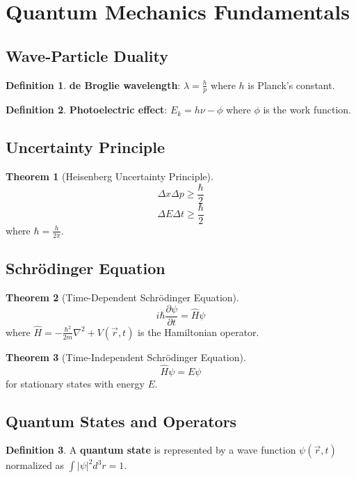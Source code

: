 \documentclass[11pt]{article}
\theoremstyle{definition}
\newtheorem{definition}{Definition}[section]
\newtheorem{theorem}{Theorem}[section]
\begin{document}
\section{Quantum Mechanics Fundamentals}

\subsection{Wave-Particle Duality}
\begin{definition}
\textbf{de Broglie wavelength}: $\lambda = \frac{h}{p}$ where $h$ is Planck's constant.
\end{definition}

\begin{definition}
\textbf{Photoelectric effect}: $E_k = h\nu - \phi$ where $\phi$ is the work function.
\end{definition}

\subsection{Uncertainty Principle}
\begin{theorem}[Heisenberg Uncertainty Principle]
$$\Delta x \Delta p \geq \frac{\hbar}{2}$$
$$\Delta E \Delta t \geq \frac{\hbar}{2}$$
where $\hbar = \frac{h}{2\pi}$.
\end{theorem}

\subsection{Schrödinger Equation}
\begin{theorem}[Time-Dependent Schrödinger Equation]
$$i\hbar \frac{\partial \psi}{\partial t} = \hat{H}\psi$$
where $\hat{H} = -\frac{\hbar^2}{2m}\nabla^2 + V(\vec{r},t)$ is the Hamiltonian operator.
\end{theorem}

\begin{theorem}[Time-Independent Schrödinger Equation]
$$\hat{H}\psi = E\psi$$
for stationary states with energy $E$.
\end{theorem}

\subsection{Quantum States and Operators}
\begin{definition}
A \textbf{quantum state} is represented by a wave function $\psi(\vec{r},t)$ normalized as $\int |\psi|^2 d^3r = 1$.
\end{definition}
\end{document}
